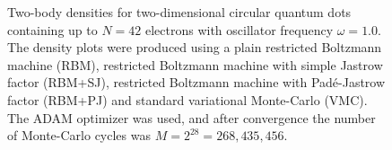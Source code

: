 \begin{landscape}
\begin{figure}
		\hspace{0.1cm}
		
		\caption{Two-body densities for two-dimensional circular quantum dots containing up to $N=42$ electrons with oscillator frequency $\omega=1.0$. The density plots were produced using a plain restricted Boltzmann machine (RBM), restricted Boltzmann machine with simple Jastrow factor (RBM+SJ), restricted Boltzmann machine with Padé-Jastrow factor (RBM+PJ) and standard variational Monte-Carlo (VMC). The ADAM optimizer was used, and after convergence the number of Monte-Carlo cycles was $M=2^{28}=268,435,456$.}%
		\label{fig:TB_2D_1p0w}
	\end{figure}
\end{landscape}

